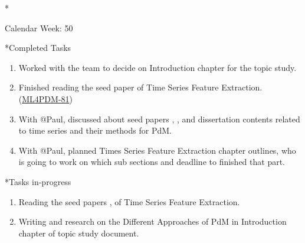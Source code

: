 \documentclass[11pt,a4paper]{article}
\begin{document}
\newpage
\begin{section}*{Calendar Week: 50 \hfill \date{11 December, 2020}}
 \begin{refsection}
     \begin{subsection}*{Completed Tasks}
         \begin{enumerate}
             \item
                   Worked with the team to decide on Introduction chapter for the topic study.
             \item
                   Finished reading the seed paper \cite{DBLP:journals/corr/abs-1709-01073} of Time Series Feature Extraction. (\href{https://ml4pdm.atlassian.net/browse/ML4PDM-81}{ML4PDM-81})
             \item
                   With @Paul, discussed about seed papers \cite{DBLP:journals/ijon/ChristBNK18}, \cite{DBLP:journals/corr/BagnallBLL16}, \cite{DBLP:journals/corr/abs-1709-01073} and dissertation \cite{DBLP:phd/dnb/Kimotho16} contents related to time series and their methods for PdM.
             \item
                   With @Paul, planned Times Series Feature Extraction chapter outlines, who is going to work on which sub sections and deadline to finished that part.
         \end{enumerate}
     \end{subsection}

     \begin{subsection}*{Tasks in-progress}
         \begin{enumerate}
             \item
                   Reading the seed papers \cite{DBLP:journals/ijon/ChristBNK18}, \cite{DBLP:journals/corr/BagnallBLL16} of Time Series Feature Extraction.
             \item
                   Writing and research on the Different Approaches of PdM in Introduction chapter of topic study document.
         \end{enumerate}
     \end{subsection}

     \printbibliography
 \end{refsection}
\end{section}
\end{document}
